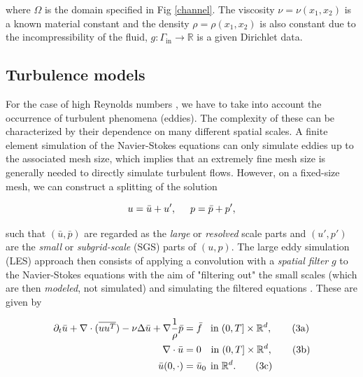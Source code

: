\documentclass[a4paper, 11pt, twoside]{article}
\begin{document}
where $\Omega$ is the domain specified in Fig \ref{channel}. The viscosity $\nu = \nu(x_1, x_2)$ is a known material constant and the density $\rho = \rho(x_1, x_2)$ is also constant due to the incompressibility of the fluid, $g:\Gamma_{\text{in}}\rightarrow \mathbb{R}$ is a given Dirichlet data. 

\subsection{Turbulence models}
 For the case of high Reynolds numbers , we have to take into account the occurrence of turbulent phenomena (eddies). The complexity of these can be characterized by their dependence on many different spatial scales. A finite element simulation of the Navier-Stokes equations can only simulate eddies up to the associated mesh size, which implies that an extremely fine mesh size is generally needed to directly simulate turbulent flows. However, on a fixed-size mesh, we can construct a splitting of the solution
 
 \begin{equation}
    u = \bar{u} + u', \hspace{0.5cm} p = \bar{p} + p',
\end{equation} 

such that $(\bar{u},\bar{p})$ are regarded as the \textit{large} or \textit{resolved} scale parts and $(u',p')$ are the \textit{small} or \textit{subgrid-scale} (SGS)  parts of $(u,p)$. The large eddy simulation (LES)  approach then consists of applying a convolution with a \textit{spatial filter} $g$  to the Navier-Stokes equations with the aim of "filtering out" the small scales (which are then \textit{modeled}, not simulated) and simulating the filtered equations . These are given by

\begin{subequations}
\begin{align}
\label{eq:SANS_strong1}
\partial_t \bar{u} + \nabla \cdot (\overline{uu^T}) - \nu \Delta \bar{u} + \nabla \frac{1}{\rho}\bar{p} &= \bar{f} \hspace{0.3cm} \mathrm{in } \hspace{0.1cm} (0,T] \times \mathbb{R}^d, \tag{3a} \\ \label{eq:SANS_strong2}
\nabla \cdot \bar{u} &= 0 \hspace{0.35cm} \mathrm{in } \hspace{0.1cm} (0,T] \times \mathbb{R}^d, \tag{3b} \\
\bar{u}(0,\cdot) &= \bar{u}_0 \hspace{0.15cm}\mathrm{in } \hspace{0.1cm} \mathbb{R}^d. \tag{3c} \label{eq:SANS_strong3}
\end{align}
\end{subequations}
    
\end{document}
